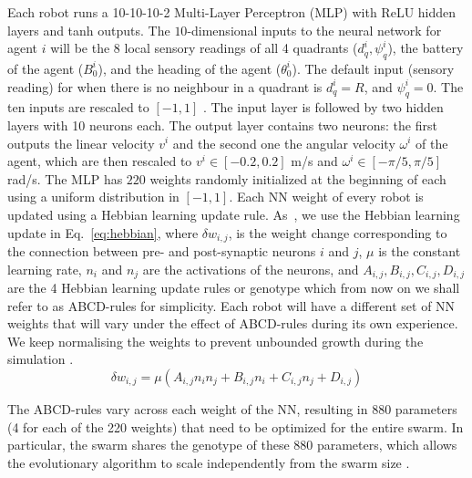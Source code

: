 Each robot runs a 10-10-10-2 Multi-Layer Perceptron (MLP) with ReLU hidden layers and tanh outputs. The $10$-dimensional inputs to the neural network for agent $i$ will be the 8 local sensory readings of all 4 quadrants ($d^i_q, \psi^i_q$), the battery of the agent ($B^i_0$), and the heading of the agent ($\theta^i_0$). The default input (sensory reading) for when there is no neighbour in a quadrant is $d^i_q=R$, and $\psi^i_q=0$. The ten inputs are rescaled to $[-1,1]$ . The input layer is followed by two hidden layers with 10 neurons each. The output layer contains two neurons: the first outputs the linear velocity $v^i$ and the second one the angular velocity $\omega^i$ of the agent, which are then rescaled to $v^i \in[-0.2,0.2]$ m/s and $\omega^i \in[-\pi/5,\pi/5]$ rad/s. The MLP has $220$ weights  randomly initialized at the beginning of each  using a uniform distribution in $[-1,1]$. Each NN weight of every robot is updated  using a Hebbian learning update rule. As~\cite{vandiggelen2025emergentheterogeneousswarmcontrol}, we use the Hebbian learning update in Eq.~\ref{eq:hebbian}, where $\delta w_{i,j}$, is the weight change corresponding to the connection between pre- and post-synaptic neurons $i$ and $j$, $\mu$ is the constant learning rate, $n_i$ and $n_j$ are the activations of the neurons, and $A_{i,j},B_{i,j},C_{i,j},D_{i,j}$ are the 4 Hebbian learning update rules or genotype which from now on we shall refer to as ABCD-rules for simplicity.
Each robot will have a different set of NN weights that will vary under the effect of ABCD-rules during its own experience. We keep normalising the weights to prevent unbounded growth during the simulation \cite{leung2025bioinspiredplasticneuralnetworks}.
\begin{equation}
    \delta w_{i,j}=\mu(A_{i,j}n_in_j+B_{i,j}n_i+C_{i,j}n_j+D_{i,j})
    \label{eq:hebbian}
\end{equation}

The ABCD-rules vary across each weight of the NN, resulting in 880 parameters (4 for each of the 220 weights) that need to be optimized for the entire swarm.
In particular, the swarm shares the genotype of these 880 parameters, which allows the evolutionary algorithm to scale independently from the swarm size \cite{vandiggelen2025emergentheterogeneousswarmcontrol}.


